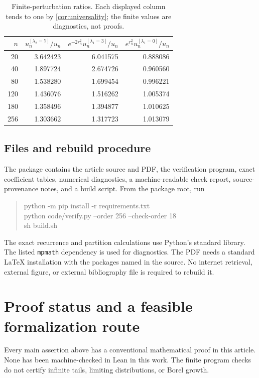\documentclass[11pt,a4paper]{article}
\theoremstyle{definition}
\numberwithin{equation}{section}
\begin{document}
\begin{table}[htbp]
\centering
\caption{Finite-perturbation ratios. Each displayed column tends to one
 by \cref{cor:universality}; the finite values are diagnostics, not proofs.}
\label{tab:perturbations}
\begin{tabular}{@{}rrrr@{}}
\toprule
\(n\)&\(u_n^{[\lambda_2=7]}/u_n\)&
\(e^{-2r_n^2}u_n^{[\lambda_1=3]}/u_n\)&
\(e^{r_n^2}u_n^{[\lambda_1=0]}/u_n\)\\
\midrule
20  &3.642423&6.041575&0.888086\\
40  &1.897724&2.674726&0.960560\\
80  &1.538280&1.699454&0.996221\\
120 &1.436076&1.516262&1.005374\\
180 &1.358496&1.394877&1.010625\\
256 &1.303662&1.317723&1.013079\\
\bottomrule
\end{tabular}
\end{table}

\subsection{Files and rebuild procedure}
The package contains the article source and PDF, the verification program,
exact coefficient tables, numerical diagnostics, a machine-readable check
report, source-provenance notes, and a build script. From the package root,
run
\begin{quote}\small\ttfamily
python -m pip install -r requirements.txt\\
python code/verify.py --order 256 --check-order 18\\
sh build.sh
\end{quote}
The exact recurrence and partition calculations use Python's standard
library. The listed \texttt{mpmath} dependency is used for diagnostics.
The PDF needs a standard LaTeX installation with the packages named in the
source. No internet retrieval, external figure, or external bibliography
file is required to rebuild it.

\section{Proof status and a feasible formalization route}
\label{sec:formalization}
Every main assertion above has a conventional mathematical proof in this
article. None has been machine-checked in Lean in this work. The finite
program checks do not certify infinite tails, limiting distributions, or
Borel growth.
\end{document}
